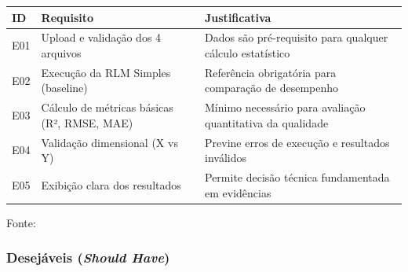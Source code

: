 \begin{quadro}[ht]
\begin{center}
\small
\captionsetup{justification=centering, labelsep=endash, width=0.75\linewidth}
\caption{Requisitos essenciais do sistema}
\label{quadro:essenciais}
\begin{threeparttable}
\begin{tabularx}{\textwidth}{|l|X|X|} \hline
\textbf{ID} & \textbf{Requisito} & \textbf{Justificativa} \\ \hline
E01 & Upload e validação dos 4 arquivos & Dados são pré-requisito para qualquer cálculo estatístico \\ \hline
E02 & Execução da RLM Simples (baseline) & Referência obrigatória para comparação de desempenho \\ \hline
E03 & Cálculo de métricas básicas (R², RMSE, MAE) & Mínimo necessário para avaliação quantitativa da qualidade \\ \hline
E04 & Validação dimensional (X vs Y) & Previne erros de execução e resultados inválidos \\ \hline
E05 & Exibição clara dos resultados & Permite decisão técnica fundamentada em evidências \\ \hline
\end{tabularx}
\begin{tablenotes}[flushleft]
\footnotesize
\item Fonte:~\oautor
\end{tablenotes}
\end{threeparttable}
\end{center}
\end{quadro}

\subsubsection{Desejáveis (\textit{Should Have})}
\label{ssubsec:desejaveis}

